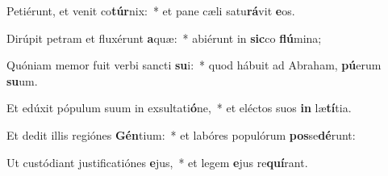 \item Petiérunt, et venit co\textbf{túr}nix:~* et pane cæli satu\textbf{rá}vit \textbf{e}os.
\item Dirúpit petram et fluxérunt \textbf{a}quæ:~* abiérunt in \textbf{sic}co \textbf{flú}mina;
\item Quóniam memor fuit verbi sancti \textbf{su}i:~* quod hábuit ad Abraham, \textbf{pú}erum \textbf{su}um.
\item Et edúxit pópulum suum in exsultati\textbf{ó}ne,~* et eléctos suos \textbf{in} læ\textbf{tí}tia.
\item Et dedit illis regiónes \textbf{Gén}tium:~* et labóres populórum \textbf{pos}se\textbf{dé}runt:
\item Ut custódiant justificatiónes \textbf{e}jus,~* et legem \textbf{e}jus re\textbf{quí}rant.
